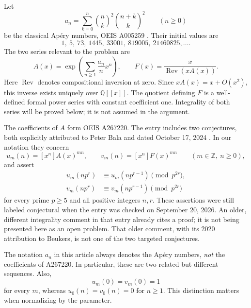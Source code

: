 \documentclass[11pt,letterpaper]{article}
\numberwithin{equation}{section}
\theoremstyle{definition}
\newcommand{\Z}{\mathbb Z}
\newcommand{\Q}{\mathbb Q}
\newcommand{\Rev}{\operatorname{Rev}}
\begin{document}
Let
\begin{equation}\label{eq:apery}
a_n=\sum_{k=0}^{n}\binom nk^2\binom{n+k}{k}^2\qquad(n\geq0)
\end{equation}
be the classical Ap\'ery numbers, OEIS A005259 \cite{oeis-apery}.
Their initial values are
\[
1,\ 5,\ 73,\ 1445,\ 33001,\ 819005,\ 21460825,\ldots.
\]
The two series relevant to the problem are
\begin{equation}\label{eq:A-F}
A(x)=\exp\!\left(\sum_{n\geq1}\frac{a_n}{n}x^n\right),
\qquad
F(x)=\frac{x}{\Rev(xA(x))}.
\end{equation}
Here $\Rev$ denotes compositional inversion at zero. Since
$xA(x)=x+O(x^2)$, this inverse exists uniquely over $\Q[[x]]$.
The quotient defining $F$ is a well-defined formal power series with
constant coefficient one. Integrality of both series will be proved
below; it is not assumed in the argument.

The coefficients of $A$ form OEIS A267220. The entry includes two
conjectures, both explicitly attributed to Peter Bala and dated
October 17, 2024 \cite{oeis-target}. In our notation they concern
\begin{equation}\label{eq:u-v}
u_m(n)=[x^n]A(x)^{mn},\qquad
v_m(n)=[x^n]F(x)^{mn}\qquad(m\in\Z,\ n\geq0),
\end{equation}
and assert
\begin{equation}\label{eq:oeis-conjectures}
\begin{split}
u_m(np^r)&\equiv u_m(np^{r-1})\pmod{p^{2r}},\\
v_m(np^r)&\equiv v_m(np^{r-1})\pmod{p^{2r}}
\end{split}
\end{equation}
for every prime $p\geq5$ and all positive integers $n,r$.
These assertions were still labeled conjectural when the entry was
checked on September 20, 2026. An older,
different integrality comment in that entry already cites a proof; it is
not being presented here as an open problem. That older comment, with its
2020 attribution to Beukers, is not one of the two targeted conjectures.

The notation $a_n$ in this article always denotes the Ap\'ery numbers,
\emph{not} the coefficients of A267220. In particular, these are two
related but different sequences. Also,
\[
u_m(0)=v_m(0)=1
\]
for every $m$, whereas $u_0(n)=v_0(n)=0$ for $n\geq1$.
This distinction matters when normalizing by the parameter.
\end{document}
